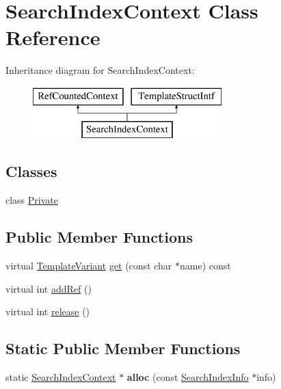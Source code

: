 \hypertarget{class_search_index_context}{}\section{Search\+Index\+Context Class Reference}
\label{class_search_index_context}
Inheritance diagram for Search\+Index\+Context\+:\begin{figure}[H]
\begin{center}
\leavevmode
\includegraphics[height=2.000000cm]{class_search_index_context}
\end{center}
\end{figure}
\subsection*{Classes}
\begin{DoxyCompactItemize}
\item 
class \mbox{\hyperlink{class_search_index_context_1_1_private}{Private}}
\end{DoxyCompactItemize}
\subsection*{Public Member Functions}
\begin{DoxyCompactItemize}
\item 
virtual \mbox{\hyperlink{class_template_variant}{Template\+Variant}} \mbox{\hyperlink{class_search_index_context_a41d9a31bc1f81dac3b586f36a5f32600}{get}} (const char $\ast$name) const
\item 
virtual int \mbox{\hyperlink{class_search_index_context_a81066a703e1ea1829a35631ee3dfbc1b}{add\+Ref}} ()
\item 
virtual int \mbox{\hyperlink{class_search_index_context_a1a1c0cae4a16e4d65a3680027d3b568d}{release}} ()
\end{DoxyCompactItemize}
\subsection*{Static Public Member Functions}
\begin{DoxyCompactItemize}
\item 
\mbox{\label{class_search_index_context_a42cb6d6ca1b52f070939e16eeed14161}} 
static \mbox{\hyperlink{class_search_index_context}{Search\+Index\+Context}} $\ast$ {\bfseries alloc} (const \mbox{\hyperlink{struct_search_index_info}{Search\+Index\+Info}} $\ast$info)
\end{DoxyCompactItemize}



